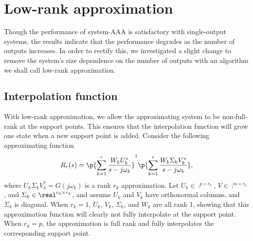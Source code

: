 \documentclass[letterpaper, 10 pt, conference]{ieeeconf}  %
\begin{document}
\section{Low-rank approximation}
Though the performance of system-AAA is satisfactory with single-output systems, the results indicate that the performance degrades as the number of outputs increases.  In order to rectify this, we investigated a slight change to remove the system's size dependence on the number of outputs with an algorithm we shall call low-rank approximation.  

\subsection{Interpolation function}
With low-rank approximation, we allow the approximating system to be non-full-rank at the support points.  This ensures that the interpolation function will grow one state when a new support point is added.  Consider the following approximating function
\begin{equation}
        R_r(s) = \p{\sum_{k=1}^r \frac{W_k U_k^*}{s-j\omega_k}}^\dagger \p{\sum_{k=1}^r \frac{W_k \Sigma_k V_k^*}{s-j\omega_k}}, \label{pir_eq}
\end{equation}
where \(U_k\Sigma_k V_k^* = G(j\omega_k)\) is a rank \(r_k\) approximation.  Let \(U_k\in\comp^{p\times r_k}\), \(V\in\comp^{m\times r_k}\), and \(\Sigma_k\in\real^{r_k \times r_k}\), and assume \(U_k\) and \(V_k\) have orthonormal columns, and \(\Sigma_k\) is diagonal.   When \(r_k=1\), \(U_k\), \(V_k\), \(\Sigma_k\), and \(W_k\) are all rank 1, showing that this approximation function will clearly not fully interpolate at the support point.   When \(r_k=p\), the approximation is full rank and fully interpolates the corresponding support point.   
\end{document}

